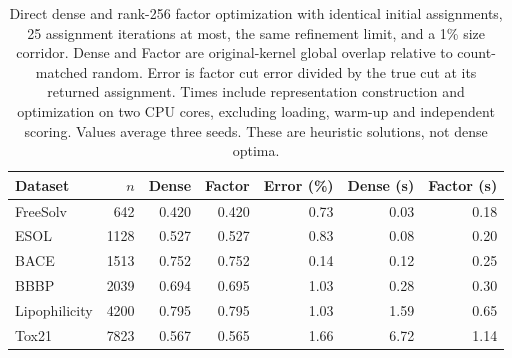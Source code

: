 \begin{table}[htbp]\centering\small
\begin{tabular}{lrrrrrr}
\toprule
Dataset & $n$ & Dense & Factor & Error (\%) & Dense (s) & Factor (s)\\\midrule
FreeSolv & 642 & 0.420 & 0.420 & 0.73 & 0.03 & 0.18\\
ESOL & 1128 & 0.527 & 0.527 & 0.83 & 0.08 & 0.20\\
BACE & 1513 & 0.752 & 0.752 & 0.14 & 0.12 & 0.25\\
BBBP & 2039 & 0.694 & 0.695 & 1.03 & 0.28 & 0.30\\
Lipophilicity & 4200 & 0.795 & 0.795 & 1.03 & 1.59 & 0.65\\
Tox21 & 7823 & 0.567 & 0.565 & 1.66 & 6.72 & 1.14\\
\bottomrule\end{tabular}
\caption{Direct dense and rank-256 factor optimization with identical initial assignments, 25 assignment iterations at most, the same refinement limit, and a 1\% size corridor. Dense and Factor are original-kernel global overlap relative to count-matched random. Error is factor cut error divided by the true cut at its returned assignment. Times include representation construction and optimization on two CPU cores, excluding loading, warm-up and independent scoring. Values average three seeds. These are heuristic solutions, not dense optima.}
\label{tab:dense-controls}
\end{table}
